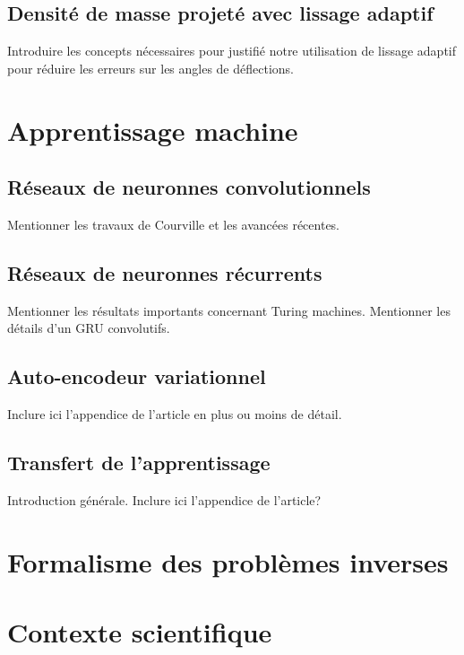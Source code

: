  
\subsection{Densité de masse projeté avec lissage adaptif}
Introduire les concepts nécessaires pour justifié notre utilisation de 
lissage adaptif pour réduire les erreurs sur les angles de déflections.


\section{Apprentissage machine}\label{sec:apprentissage machine}

\subsection{Réseaux de neuronnes convolutionnels}
Mentionner les travaux de Courville et les avancées récentes.

\subsection{Réseaux de neuronnes récurrents}
Mentionner les résultats importants concernant Turing machines. 
Mentionner les détails d'un GRU convolutifs.



\subsection{Auto-encodeur variationnel}
Inclure ici l'appendice de l'article en plus ou moins de détail.

\subsection{Transfert de l'apprentissage}
Introduction générale.
Inclure ici l'appendice de l'article?

\section{Formalisme des problèmes inverses}\label{sec:formalisme probleme inverse}





\section{Contexte scientifique}\label{sec:contexte}




